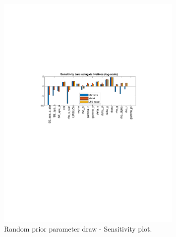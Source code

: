 
\begin{figure}[H]
\centering 
\includegraphics[width=0.8\textwidth]{monetary/identification/monetary_sensitivity_Random_prior_params}
\caption{Random prior parameter draw  - Sensitivity plot.}\label{Fig:sensitivity:Random_prior_params}
\end{figure}

